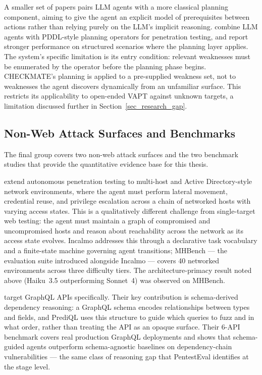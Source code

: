 A smaller set of papers pairs LLM agents with a more classical planning component, aiming to give the agent an explicit model of prerequisites between actions rather than relying purely on the LLM's implicit reasoning. \citet{wang2025checkmate} combine LLM agents with PDDL-style planning operators for penetration testing, and report stronger performance on structured scenarios where the planning layer applies. The system's specific limitation is its entry condition: relevant weaknesses must be enumerated by the operator before the planning phase begins. CHECKMATE's planning is applied to a pre-supplied weakness set, not to weaknesses the agent discovers dynamically from an unfamiliar surface. This restricts its applicability to open-ended VAPT against unknown targets, a limitation discussed further in Section~\ref{sec_research_gap}.

\subsection{Non-Web Attack Surfaces and Benchmarks}
\label{subsec_benchmarks}

The final group covers two non-web attack surfaces and the two benchmark studies that provide the quantitative evidence base for this thesis.

\citet{singer2025incalmo} extend autonomous penetration testing to multi-host and Active Directory-style network environments, where the agent must perform lateral movement, credential reuse, and privilege escalation across a chain of networked hosts with varying access states. This is a qualitatively different challenge from single-target web testing: the agent must maintain a graph of compromised and uncompromised hosts and reason about reachability across the network as its access state evolves. Incalmo addresses this through a declarative task vocabulary and a finite-state machine governing agent transitions; MHBench --- the evaluation suite introduced alongside Incalmo --- covers 40 networked environments across three difficulty tiers. The architecture-primacy result noted above (Haiku~3.5 outperforming Sonnet~4) was observed on MHBench.

\citet{liu2025prediql} target GraphQL APIs specifically. Their key contribution is schema-derived dependency reasoning: a GraphQL schema encodes relationships between types and fields, and PrediQL uses this structure to guide which queries to fuzz and in what order, rather than treating the API as an opaque surface. Their 6-API benchmark covers real production GraphQL deployments and shows that schema-guided agents outperform schema-agnostic baselines on dependency-chain vulnerabilities --- the same class of reasoning gap that PentestEval identifies at the stage level.

